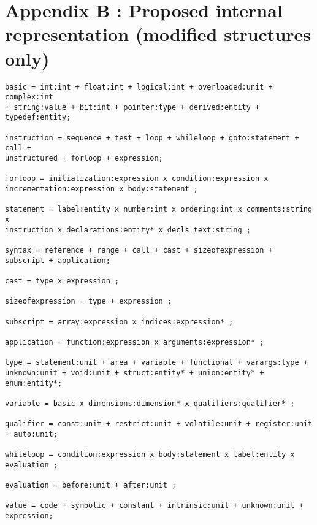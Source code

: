 \documentclass[a4paper]{article}
\begin{document}
\section{Appendix B : Proposed internal representation (modified structures only)}
\begin{verbatim}
basic = int:int + float:int + logical:int + overloaded:unit + complex:int 
+ string:value + bit:int + pointer:type + derived:entity + typedef:entity;

instruction = sequence + test + loop + whileloop + goto:statement + call +
unstructured + forloop + expression;

forloop = initialization:expression x condition:expression x
incrementation:expression x body:statement ;

statement = label:entity x number:int x ordering:int x comments:string x
instruction x declarations:entity* x decls_text:string ;

syntax = reference + range + call + cast + sizeofexpression + subscript + application;

cast = type x expression ;

sizeofexpression = type + expression ;

subscript = array:expression x indices:expression* ;

application = function:expression x arguments:expression* ;

type = statement:unit + area + variable + functional + varargs:type +
unknown:unit + void:unit + struct:entity* + union:entity* + enum:entity*;

variable = basic x dimensions:dimension* x qualifiers:qualifier* ;

qualifier = const:unit + restrict:unit + volatile:unit + register:unit + auto:unit;

whileloop = condition:expression x body:statement x label:entity x
evaluation ;

evaluation = before:unit + after:unit ;

value = code + symbolic + constant + intrinsic:unit + unknown:unit + expression;
\end{verbatim}
\newpage


\end{document}
